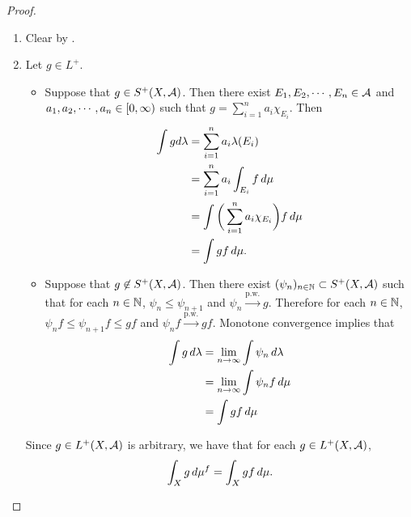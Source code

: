 \documentclass{book}
\begin{document}
\begin{proof}
\begin{enumerate}
\begin{itemize}
\begin{align*}
					& = \limn \sum\limits_{j \in \N} g_n(j) \\
					& = \limn \int g_n \, \dsh \\
					& = \int \limn g_n \, \dsh \hspace{4mm} \text{(by monotone convergence theorem)} \\ 
					& = \sum\limits_{j \in \N} \limn g_n(j) \\
					& = \sum\limits_{j \in \N} \limn \int_{A_j} \phi_n \dmu  \\
					& = \sum\limits_{j \in \N} \int_{A_j} f \dmu \\
					& = \sum\limits_{j \in \N} \mu^f(A_j).
				\end{align*} 
			\end{itemize}
			Hence $\mu^f$ is a measure on $(X, \MA)$.
			\item Clear by .
			\item Let $g \in L^+$. 
			\begin{itemize}
				\item Suppose that $g \in S^+(X, \mathcal{A})$. Then there exist $E_1, E_2, \cdots, E_n \in \mathcal{A}$ and  $a_1, a_2, \cdots, a_n \in [0,\infty)$ such that $g = \sum\limits_{i=1}^n a_i \chi_{E_i}$. Then
				\begin{align*}
					\int g d\lambda 
					&= \sum\limits_{i=1}^n a_i \lambda(E_i)\\
					&= \sum\limits_{i=1}^n a_i \int_{E_i} f \, d \mu\\
					&= \int \bigg(\sum\limits_{i=1}^n a_i\chi_{E_i} \bigg) f \, d \mu\\
					&= \int gf \, d \mu.
				\end{align*}
				\item Suppose that $g \not \in S^+(X, \mathcal{A})$. Then there exist $(\psi_n)_{n \in \mathbb{N}} \subset S^+(X, \mathcal{A})$ such that for each $n \in \mathbb{N}$, $\psi_n \leq \psi_{n+1}$ and $\psi_n \xrightarrow{\text{p.w.}} g$. Therefore for each $n \in \mathbb{N}$, $\psi_n f \leq \psi_{n+1}f \leq gf$ and $\psi_nf \xrightarrow{\text{p.w.}} gf$. Monotone convergence implies that
				\begin{align*}
					\int g \, d \lambda 
					&= \lim \limits_{n \rightarrow \infty} \int \psi_n \, d \lambda\\
					&= \lim \limits_{n \rightarrow \infty} \int \psi_n f \, d \mu \\
					&= \int g f \, d \mu 
				\end{align*}
			\end{itemize}
			Since $g \in L^+(X, \mathcal{A})$ is arbitrary, we have that for each $g \in L^+(X, \mathcal{A})$, 
			$$\int_X g \, d \mu^f = \int_X g f \, d \mu. $$
		\end{enumerate}
	\end{proof}	
	
\end{document}
